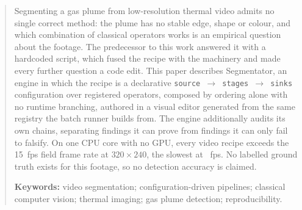 \documentclass[11pt, a4paper, DIV=11, parskip=half-]{scrartcl}
\begin{document}
\begin{abstract}
\noindent
Segmenting a gas plume from low-resolution thermal video admits no single correct
method: the plume has no stable edge, shape or colour, and which combination of
classical operators works is an empirical question about the footage. The
predecessor to this work answered it with a hardcoded script, which fused the
recipe with the machinery and made every further question a code edit. This paper
describes Segmentator, an engine in which the recipe is a declarative
\texttt{source $\rightarrow$ stages $\rightarrow$ sinks} configuration over
\NumStages{} registered operators, composed by ordering alone with no runtime
branching, authored in a visual editor generated from the same registry the
batch runner builds from. The engine additionally audits its own chains,
separating findings it can prove from findings it can only fail to falsify. On
one CPU core with no GPU, every video recipe exceeds the 15~fps field frame rate
at $320\times240$, the slowest at \BenchSlowestVideoFps~fps. No labelled ground
truth exists for this footage, so no detection accuracy is claimed.

\vspace{2mm}
\noindent\textbf{Keywords:} video segmentation; configuration-driven pipelines;
classical computer vision; thermal imaging; gas plume detection; reproducibility.
\end{abstract}












\printbibliography[heading=bibnumbered]

\appendix

\end{document}
